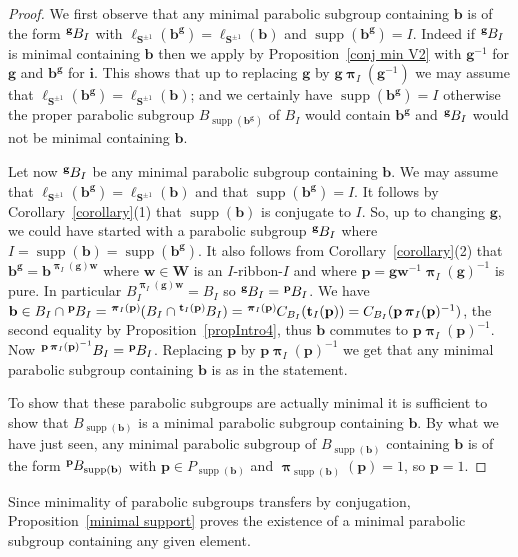 \documentclass{amsart}
\numberwithin{equation}{section}
\newcommand\lexp[2]{\kern\scriptspace\vphantom{#2}^{#1}\kern-\scriptspace#2}
\newcommand\lS{{\ell_{\bS^{\pm1}}}}
\newcommand\inv{^{-1}}
\newcommand\bb{{\mathbf b}}
\newcommand\bg{{\mathbf g}}
\newcommand\bi{{\mathbf i}}
\newcommand\bp{{\mathbf p}}
\newcommand\bt{{\mathbf t}}
\newcommand\bw{{\mathbf w}}
\newcommand\bS{{\mathbf S}}
\newcommand\bW{{\mathbf W}}
\DeclareMathOperator\bpi{\boldsymbol\pi}
\DeclareMathOperator\supp{supp}
\begin{document}
\begin{proof}
We first observe that any minimal parabolic subgroup containing $\bb$ is of the form
$\lexp\bg  B_I$ with $\lS(\bb^\bg)=\lS(\bb)$ and $\supp(\bb^\bg)=I$. Indeed
if  $\lexp\bg B_I$ is minimal containing $\bb$ then we apply by Proposition~\ref{conj min
V2} with $\bg\inv$ for $\bg$ and $\bb^\bg$ for $\bi$. This shows that
up  to  replacing  $\bg$  by  $\bg\bpi_I(\bg\inv)$ we may assume that
$\lS(\bb^\bg)=\lS(\bb)$; and we certainly have $\supp(\bb^\bg)=I$ otherwise
the  proper parabolic subgroup $B_{\supp(\bb^\bg)}$  of $B_I$ would contain
$\bb^\bg$ and $\lexp\bg B_I$ would not be minimal containing $\bb$.

Let now $\lexp\bg B_I$ be  any minimal parabolic subgroup containing $\bb$.
We may assume that $\lS(\bb^\bg)=\lS(\bb)$ and that $\supp(\bb^\bg)=I$. 
It follows by Corollary~\ref{corollary}(1) that
$\supp(\bb)$ is conjugate to $I$. So, up to changing $\bg$, we could have started with a parabolic subgroup $\lexp\bg
B_I$ where $I=\supp(\bb)=\supp(\bb^\bg)$. It also follows from Corollary~\ref{corollary}(2) that $\bb^\bg=
\bb^{\bpi_I(\bg)\bw}$ where $\bw\in\bW$ is an $I$-ribbon-$I$ and
 where $\bp=\bg\bw\inv\bpi_I(\bg)\inv$ is pure.
In particular $B_I^{\bpi_I(\bg)\bw}=B_I$ so $\lexp\bg
B_I=\lexp{\bp}B_I$. We have
$\bb\in B_I\cap \lexp\bp B_I=\lexp{\bpi_I(\bp)}(B_I\cap
\lexp{\bt_I(\bp)} B_I)=\lexp{\bpi_I(\bp)}
C_{B_I}(\bt_I(\bp))=C_{B_I}(\bp\bpi_I(\bp)\inv)$, the second equality by
Proposition~\ref{propIntro4}, thus $\bb$ commutes to
$\bp\bpi_I(\bp)\inv$. Now
$\lexp{\bp\bpi_I(\bp)\inv}B_I=\lexp\bp B_I$.  Replacing $\bp$
 by $\bp\bpi_I(\bp)\inv$ we get that any minimal parabolic subgroup containing $\bb$ is as
 in the statement. 

To show that these parabolic subgroups are actually minimal
it is sufficient to show that $B_{\supp(\bb)}$ is a minimal parabolic subgroup
containing $\bb$.
By what we have just seen, any minimal parabolic subgroup of $B_{\supp(\bb)}$ containing $\bb$ is of the
form $\lexp \bp B_{\supp(\bb)}$ with $\bp\in P_{\supp(\bb)}$ and $\bpi_{\supp(\bb)}(\bp)=1$, so $\bp=1$.
\end{proof}
Since minimality of parabolic subgroups transfers by conjugation,
Proposition~\ref{minimal support} proves the existence of a minimal
parabolic subgroup containing any given element.
\end{document}
